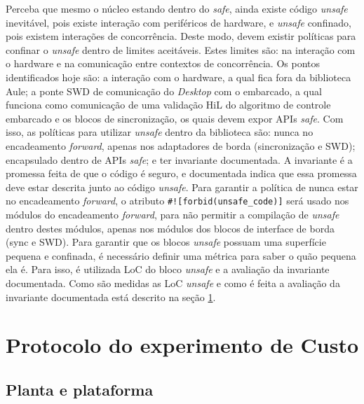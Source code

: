 Perceba que mesmo o núcleo estando dentro do \textit{safe}, ainda existe código \textit{unsafe} inevitável, pois existe interação com periféricos de hardware, e \textit{unsafe} confinado, pois existem interações de concorrência. Deste modo, devem existir políticas para confinar o \textit{unsafe} dentro de limites aceitáveis. Estes limites são: na interação com o hardware e na comunicação entre contextos de concorrência. Os pontos identificados hoje são: a interação com o hardware, a qual fica fora da biblioteca Aule; a ponte \ac{SWD} de comunicação do \textit{Desktop} com o embarcado, a qual funciona como comunicação de uma validação \ac{HiL} do algoritmo de controle embarcado e os blocos de sincronização, os quais devem expor \acp{API} \textit{safe}. Com isso, as políticas para utilizar \textit{unsafe} dentro da biblioteca são: nunca no encadeamento \textit{forward}, apenas nos adaptadores de borda (sincronização e \ac{SWD}); encapsulado dentro de \acp{API} \textit{safe}; e ter invariante documentada. A invariante é a promessa feita de que o código é seguro, e documentada indica que essa promessa deve estar descrita junto ao código \textit{unsafe}. Para garantir a política de nunca estar no encadeamento \textit{forward}, o atributo \texttt{\#![forbid(unsafe\_code)]} será usado nos módulos do encadeamento \textit{forward}, para não permitir a compilação de \textit{unsafe} dentro destes módulos, apenas nos módulos dos blocos de interface de borda (sync e \ac{SWD}). Para garantir que os blocos \textit{unsafe} possuam uma superfície pequena e confinada, é necessário definir uma métrica para saber o quão pequena ela é. Para isso, é utilizada \ac{LoC} do bloco \textit{unsafe} e a avaliação da invariante documentada. Como são medidas as \ac{LoC} \textit{unsafe} e como é feita a avaliação da invariante documentada está descrito na seção \ref{sec:experiment-proc}.

\section{Protocolo do experimento de Custo}
\label{sec:experiment-proc}

\subsection{Planta e plataforma}
\label{subsec:plant-platform}


